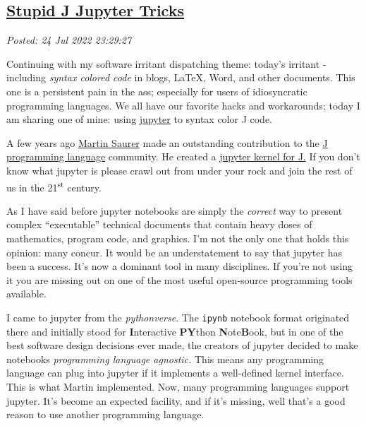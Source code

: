 %

\subsection*{\href{http://analyzethedatanotthedrivel.org/2022/07/24/stupid-j-jupyter-tricks/}{Stupid J Jupyter Tricks}}


\noindent\emph{Posted: 24 Jul 2022 23:29:27}
\vspace{6pt}

Continuing with my software irritant dispatching theme: today's irritant
- including \emph{syntax colored code} in blogs, \LaTeX, Word, and other
documents. This one is a persistent pain in the ass; especially for
users of idiosyncratic programming languages. We all have our favorite
hacks and workarounds; today I am sharing one of mine: using
\href{https://jupyter.org/}{jupyter} to syntax color J code.

A few years ago \href{https://github.com/martin-saurer}{Martin Saurer}
made an outstanding contribution to the
\href{https://code2.jsoftware.com/wiki/Main_Page}{J programming
language} community. He created a
\href{https://github.com/martin-saurer/jkernel}{jupyter kernel for J.}
If you don't know what jupyter is please crawl out from under your rock
and join the rest of us in the 21\textsuperscript{st} century.

As I have said before jupyter notebooks are simply the \emph{correct}
way to present complex ``executable'' technical documents that contain
heavy doses of mathematics, program code, and graphics. I'm not the only
one that holds this opinion: many concur. It would be an understatement
to say that jupyter has been a success. It's now a dominant tool in many
disciplines. If you're not using it you are missing out on one of the
most useful open-source programming tools available.

I came to jupyter from the \emph{pythonverse}. The \texttt{ipynb} notebook format
originated there and initially stood for \textbf{I}nteractive
\textbf{PY}thon \textbf{N}ote\textbf{B}ook, but in one of the best
software design decisions ever made, the creators of jupyter decided to
make notebooks \emph{programming language agnostic.} This means any
programming language can plug into jupyter if it implements a
well-defined kernel interface. This is what Martin implemented. Now,
many programming languages support jupyter. It's become an expected
facility, and if it's missing, well that's a good reason to use another
programming language.

